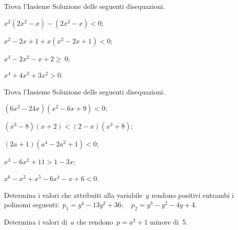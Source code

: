 \begin{esercizio}[\Ast]
 \label{ese:21.48}
Trova l'Insieme Soluzione delle seguenti disequazioni.
\begin{multicols}{2}
 \begin{enumeratea}
 \item $x^{2}(2x^{2}-x)-(2x^{2}-x)<0$;
\item $x^{2}-2x+1+x(x^{2}-2x+1)<0$;
\item $x^{3}-2x^{2}-x+2\ge~0$;
\item $x^{4}+4x^{3}+3x^{2}>0$.
\end{enumeratea}
\end{multicols}
\end{esercizio}

\begin{esercizio}[\Ast]
 \label{ese:21.49}
Trova l'Insieme Soluzione delle seguenti disequazioni.
\begin{multicols}{2}
 \begin{enumeratea}
 \item $(6x^{2}-24x)(x^{2}-6x+9)<0$;
\item $(x^{3}-8)(x+2)<(2-x)(x^{3}+8)$;
\item $(2a+1)(a^{4}-2a^{2}+1)<0$;
\item $x^{3}-6x^{2}+11>1-3x$;
\item $x^{6}-x^{2}+x^{5}-6x^{4}-x+6<0$.
\end{enumeratea}
\end{multicols}
\end{esercizio}

\begin{esercizio}[\Ast]
 \label{ese:21.50}
 Determina i valori che attribuiti alla variabile~$y$ rendono positivi
entrambi i polinomi
seguenti:~$p_{1}=y^{4}-13y^{2}+36;\quad p_{2}=y^{3}-y^{2}-4y+4.$
\end{esercizio}

\begin{esercizio}[\Ast]
 \label{ese:21.51}
 Determina i valori di~$a$ che rendono~$p=a^{2}+1$ minore di~5.
\end{esercizio}

